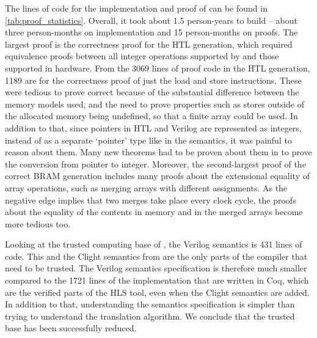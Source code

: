 The lines of code for the implementation and proof of \vericert{} can be found
in \cref{tab:proof_statistics}.  Overall, it took about 1.5 person-years to
build \vericert{} -- about three person-months on implementation and 15
person-months on proofs.  The largest proof is the correctness proof for the HTL
generation, which required equivalence proofs between all integer operations
supported by \compcert{} and those supported in hardware.  From the 3069 lines
of proof code in the HTL generation, 1189 are for the correctness proof of just
the load and store instructions.  These were tedious to prove correct because of
the substantial difference between the memory models used, and the need to prove
properties such as stores outside of the allocated memory being undefined, so
that a finite array could be used. In addition to that, since pointers in HTL
and Verilog are represented as integers, instead of as a separate `pointer' type
like in the \compcert{} semantics, it was painful to reason about them.  Many
new theorems had to be proven about them in \vericert{} to prove the conversion
from pointer to integer.  Moreover, the second-largest proof of the correct
\gls{BRAM} generation includes many proofs about the extensional equality of
array operations, such as merging arrays with different assignments.  As the
negative edge implies that two merges take place every clock cycle, the proofs
about the equality of the contents in memory and in the merged arrays become
more tedious too.

Looking at the trusted computing base of \vericert{}, the Verilog semantics is
431 lines of code.  This and the Clight semantics from \compcert{} are the only
parts of the compiler that need to be trusted.  The Verilog semantics
specification is therefore much smaller compared to the 1721 lines of the
implementation that are written in Coq, which are the verified parts of the HLS
tool, even when the Clight semantics are added.  In addition to that,
understanding the semantics specification is simpler than trying to understand
the translation algorithm. We conclude that the trusted base has been
successfully reduced.

